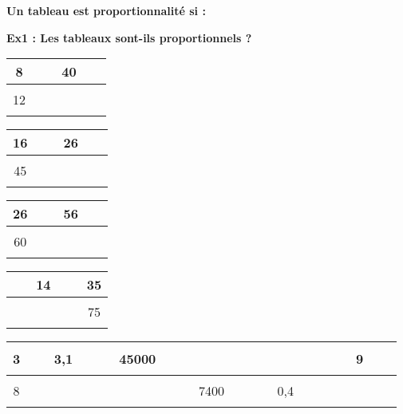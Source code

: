 \textbf{Un tableau est proportionnalité si : }\dotfill \\ \Pointilles[2] 

\textbf{Ex1 : Les tableaux sont-ils proportionnels ?}


\begin{multicols}{4}\noindent
  \begin{center} \begin{tabular}{|c|c|}  \hline
      8    & 40\\  \hline
      12 & $\phantom{\dfrac{azertyuiop}{O}}$\\  \hline
    \end{tabular} \end{center}
    \Pointilles[3]
  \begin{center} \begin{tabular}{|c|c|}   \hline
      16  & 26\\  \hline
      45 & $\phantom{\dfrac{azertyuiop}{O}}$\\  \hline
    \end{tabular} \end{center}
    \Pointilles[3]
  \begin{center} \begin{tabular}{|c|c|}   \hline
      26  & 56\\  \hline
      60 & $\phantom{\dfrac{azertyuiop}{O}}$\\  \hline
    \end{tabular} \end{center}
    \Pointilles[3]
  \begin{center}\begin{tabular}{|c|c|}  \hline
      14 & 35\\  \hline
      $\phantom{\dfrac{azertyuiop}{O}}$ & 75\\  \hline
    \end{tabular} \end{center}
    \Pointilles[3]
\end{multicols}

\begin{center} \begin{tabular}{|c|c|c|c|c|c|} \hline
   3 &  3,1                   &                  45000 &  $\phantom{\dfrac{azertyuiop}{O}}$ & $\phantom{\dfrac{azertyuiop}{O}}$&                     9\\ \hline
   8 &  $\phantom{\dfrac{azertyuiop}{O}}$ & $\phantom{\dfrac{azertyuiop}{O}}$ &                   7400 &                    0,4 &  $\phantom{\dfrac{azertyuiop}{O}}$\\ \hline     
  \end{tabular}\end{center}


